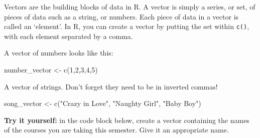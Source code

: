 \documentclass[
  letterpaper,
  DIV=11,
  numbers=noendperiod]{scrreprt}
\newenvironment{Shaded}{\begin{snugshade}}{\end{snugshade}}
\newcommand{\NormalTok}[1]{\textcolor[rgb]{0.00,0.23,0.31}{#1}}
\begin{document}
Vectors are the building blocks of data in R. A vector is simply a
series, or set, of pieces of data such as a string, or numbers. Each
piece of data in a vector is called an `element'. In R, you can create a
vector by putting the set within \texttt{c()}, with each element
separated by a comma.

A vector of numbers looks like this:

\begin{Shaded}
\begin{Highlighting}[]

\NormalTok{number\_vector \textless{}{-} c(1,2,3,4,5)}

\end{Highlighting}
\end{Shaded}

A vector of strings. Don't forget they need to be in inverted commas!

\begin{Shaded}
\begin{Highlighting}[]
\NormalTok{song\_vector \textless{}{-} c("Crazy in Love", "Naughty Girl", "Baby Boy")}
\end{Highlighting}
\end{Shaded}

\textbf{Try it yourself:} in the code block below, create a vector
containing the names of the courses you are taking this semester. Give
it an appropriate name.

\begin{Shaded}
\begin{Highlighting}[]

\end{Highlighting}
\end{Shaded}
\end{document}
